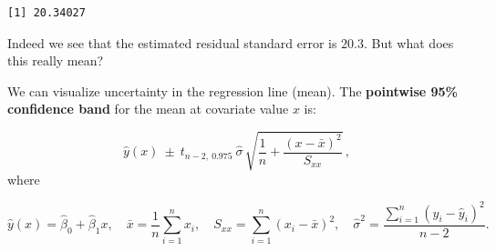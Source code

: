 \documentclass[
  letterpaper,
  DIV=11,
  numbers=noendperiod]{scrreprt}
\newenvironment{Shaded}{\begin{snugshade}}{\end{snugshade}}
\newcommand{\CommentTok}[1]{\textcolor[rgb]{0.37,0.37,0.37}{#1}}
\newcommand{\DecValTok}[1]{\textcolor[rgb]{0.68,0.00,0.00}{#1}}
\newcommand{\FunctionTok}[1]{\textcolor[rgb]{0.28,0.35,0.67}{#1}}
\newcommand{\NormalTok}[1]{\textcolor[rgb]{0.00,0.23,0.31}{#1}}
\newcommand{\OtherTok}[1]{\textcolor[rgb]{0.00,0.23,0.31}{#1}}
\newcommand{\SpecialCharTok}[1]{\textcolor[rgb]{0.37,0.37,0.37}{#1}}
\begin{document}
\begin{Shaded}
\end{Shaded}

\begin{verbatim}
[1] 20.34027
\end{verbatim}

Indeed we see that the estimated residual standard error is \(20.3\).
But what does this really mean?

We can visualize uncertainty in the regression line (mean). The
\textbf{pointwise 95\% confidence band} for the mean at covariate value
\(x\) is:

\[
\hat{y}(x)\ \pm\ t_{n-2,\ 0.975}\ \hat{\sigma}\,
\sqrt{\frac{1}{n} + \frac{(x-\bar x)^2}{S_{xx}}}\,,
\] where

\[
\hat{y}(x)=\hat\beta_0+\hat\beta_1 x,\quad
\bar x=\frac{1}{n}\sum_{i=1}^n x_i,\quad
S_{xx}=\sum_{i=1}^n (x_i-\bar x)^2,\quad
\hat{\sigma}^2=\frac{\sum_{i=1}^n (y_i - \hat y_i)^2}{n-2}.
\]
\end{document}
